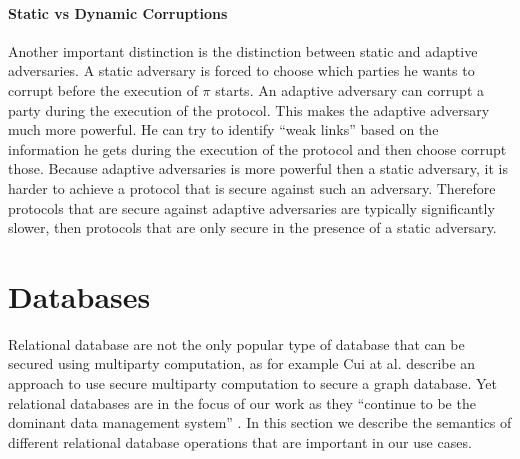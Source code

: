 \paragraph{Static vs Dynamic Corruptions}
Another important distinction is the distinction between static and adaptive adversaries. A static adversary is forced to choose which parties he wants to corrupt before the execution of $ \pi $ starts. An adaptive adversary can corrupt a party during the execution of the protocol. This makes the adaptive adversary much more powerful. He can try to identify ``weak links'' based on the information he gets during the execution of the protocol and then choose corrupt those. Because adaptive adversaries is more powerful then a static adversary, it is harder to achieve a protocol that is secure against such an adversary. Therefore protocols that are secure against adaptive adversaries are typically significantly slower, then protocols that are only secure in the presence of a static adversary.


\section{Databases}
\label{Databases}
Relational database are not the only popular type of database that can be secured using multiparty computation, as for example Cui at al. \cite{cui2020secure} describe an approach to use secure multiparty computation to secure a graph database. Yet relational databases are in the focus of our work as they ``continue to be the dominant data management system'' \cite{Archer2018FromKT}.  In this section we describe the semantics of different relational database operations that are important in our use cases. %


